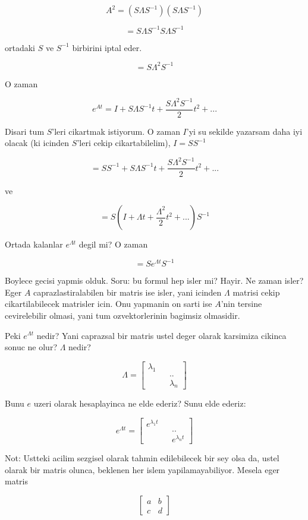 \documentclass[12pt,fleqn]{article}
\begin{document}
\[ A^2 = (S \Lambda S^{-1})(S \Lambda S^{-1}) \]

\[ = S \Lambda S^{-1}S \Lambda S^{-1} \]

ortadaki $S$ ve $S^{-1}$ birbirini iptal eder. 

\[ = S \Lambda^2 S^{-1} \]

O zaman 

\[ e^{At} = I + S \Lambda S^{-1} t + \frac{S \Lambda^2 S^{-1}}{2}t^2 + ...\]

Disari tum $S$'leri cikartmak istiyorum. O zaman $I$'yi su sekilde yazarsam
daha iyi olacak (ki icinden $S$'leri cekip cikartabilelim), $I = SS^{-1}$

\[ = SS^{-1} + S \Lambda S^{-1} t + \frac{S \Lambda^2 S^{-1}}{2}t^2 + ...\]

ve

\[ = S (I + \Lambda t + \frac{\Lambda^2}{2}t^2 + ...) S^{-1}\]

Ortada kalanlar $e^{\Lambda t}$ degil mi? O zaman

\[ = S e^{\Lambda t}S^{-1} \]

Boylece gecisi yapmis olduk. Soru: bu formul hep isler mi? Hayir. Ne zaman
isler? Eger $A$ caprazlastiralabilen bir matris ise isler, yani icinden
$\Lambda$ matrisi cekip cikartilabilecek matrisler icin. Onu yapmanin on
sarti ise $A$'nin tersine cevirelebilir olmasi, yani tum ozvektorlerinin
bagimsiz olmasidir.

Peki $e^{\Lambda t}$ nedir? Yani caprazsal bir matris ustel deger olarak
karsimiza cikinca sonuc ne olur? $\Lambda$ nedir?

\[ \Lambda =
\left[\begin{array}{ccc}
\lambda_1 && \\
&&.. \\
&& \lambda_n
\end{array}\right]
 \]

Bunu $e$ uzeri olarak hesaplayinca ne elde ederiz? Sunu elde ederiz:


\[ e^{\Lambda t} =
\left[\begin{array}{ccc}
e^{\lambda_1t} && \\
&&.. \\
&& e^{\lambda_n t}
\end{array}\right]
 \]

Not: Ustteki acilim sezgisel olarak tahmin edilebilecek bir sey olsa da,
ustel olarak bir matris olunca, beklenen her islem yapilamayabiliyor. Mesela 
eger matris

\[ 
\left[\begin{array}{cc}
a & b \\ c & d
\end{array}\right]
 \]
\end{document}
